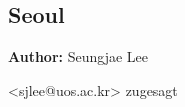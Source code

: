 \subsection{Seoul}
\label{ch:scenarios:seoul}
\hfill \textbf{Author:} Seungjae Lee

<sjlee@uos.ac.kr> zugesagt

